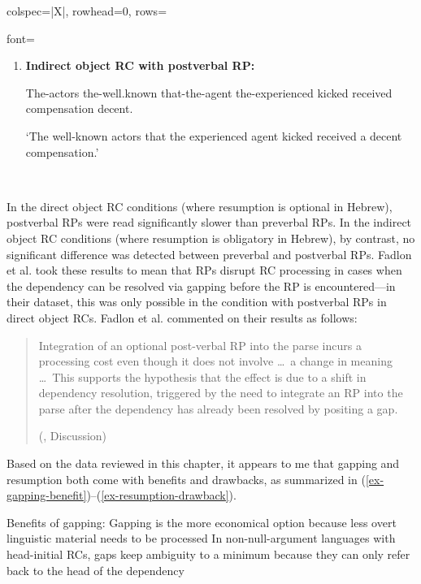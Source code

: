 \begin{longtblr}[caption={\textcite{fadlon.etal2018}: Self-paced reading task in Experiment 1}, label={tblr:fadlon2}]{colspec={|X|}, rowhead=0, rows={font=\raggedright{}}}
\begin{varwidth}{\linewidth}
\begin{enumerate}[\bfseries (a),itemsep=5pt]
The-actors the-well.known that- the-agent the-experienced kicked received compensation decent.\par\nobreak
`The well-known actors that the experienced agent kicked received a decent compensation.'
\item \textbf{Indirect object RC with postverbal RP:}\par\nobreak
The-actors the-well.known that-the-agent the-experienced kicked  received compensation decent.\par\nobreak
`The well-known actors that the experienced agent kicked received a decent compensation.'
\end{enumerate}\end{varwidth}\\\hline
\end{longtblr}

\noindent In the direct object RC conditions (where resumption is optional in Hebrew), postverbal RPs were read significantly slower than preverbal RPs. In the indirect object RC conditions (where resumption is obligatory in Hebrew), by contrast, no significant difference was detected between preverbal and postverbal RPs. Fadlon et al. took these results to mean that RPs disrupt RC processing in cases when the dependency can be resolved via gapping before the RP is encountered---in their dataset, this was only possible in the condition with postverbal RPs in direct object RCs. Fadlon et al. commented on their results as follows:

\begin{quote}\begin{samepage}
Integration of an optional post-verbal RP into the parse incurs a processing cost even though it does not involve \dots ~a change in meaning \dots ~This supports the hypothesis that the effect is due to a shift in dependency resolution, triggered by the need to integrate an RP into the parse after the dependency has already been resolved by positing a gap.\par\nobreak
\hfill (\cite{fadlon.etal2018}, Discussion)
\end{samepage}\end{quote}\vspace{-12pt}

Based on the data reviewed in this chapter, it appears to me that gapping and resumption both come with benefits and drawbacks, as summarized in (\ref{ex-gapping-benefit})--(\ref{ex-resumption-drawback}).

\pex\label{ex-gapping-benefit}Benefits of gapping:
\a Gapping is the more economical option because less overt linguistic material needs to be processed
\a In non-null-argument languages with head-initial RCs, gaps keep ambiguity to a minimum because they can only refer back to the head of the dependency
\xe 

